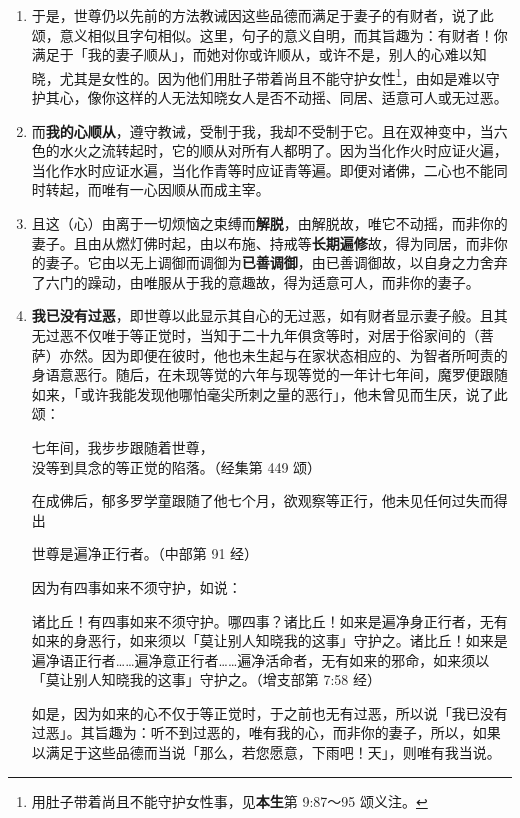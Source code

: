 \begin{enumerate}\item 于是，世尊仍以先前的方法教诫因这些品德而满足于妻子的有财者，说了此颂，意义相似且字句相似。这里，句子的意义自明，而其旨趣为：有财者！你满足于「我的妻子顺从」，而她对你或许顺从，或许不是，别人的心难以知晓，尤其是女性的。因为他们用肚子带着尚且不能守护女性\footnote{用肚子带着尚且不能守护女性事，见\textbf{本生}第 9:87～95 颂义注。}，由如是难以守护其心，像你这样的人无法知晓女人是否不动摇、同居、适意可人或无过恶。
\item 而\textbf{我的心顺从}，遵守教诫，受制于我，我却不受制于它。且在双神变中，当六色的水火之流转起时，它的顺从对所有人都明了。因为当化作火时应证火遍，当化作水时应证水遍，当化作青等时应证青等遍。即便对诸佛，二心也不能同时转起，而唯有一心因顺从而成主宰。
\item 且这（心）由离于一切烦恼之束缚而\textbf{解脱}，由解脱故，唯它不动摇，而非你的妻子。且由从燃灯佛时起，由以布施、持戒等\textbf{长期遍修}故，得为同居，而非你的妻子。它由以无上调御而调御为\textbf{已善调御}，由已善调御故，以自身之力舍弃了六门的躁动，由唯服从于我的意趣故，得为适意可人，而非你的妻子。
\item \textbf{我已没有过恶}，即世尊以此显示其自心的无过恶，如有财者显示妻子般。且其无过恶不仅唯于等正觉时，当知于二十九年俱贪等时，对居于俗家间的（菩萨）亦然。因为即便在彼时，他也未生起与在家状态相应的、为智者所呵责的身语意恶行。随后，在未现等觉的六年与现等觉的一年计七年间，魔罗便跟随如来，「或许我能发现他哪怕毫尖所刺之量的恶行」，他未曾见而生厌，说了此颂：\begin{quoting}七年间，我步步跟随着世尊，\\没等到具念的等正觉的陷落。（经集第 449 颂）\end{quoting}在成佛后，郁多罗学童跟随了他七个月，欲观察等正行，他未见任何过失而得出\begin{quoting}世尊是遍净正行者。（中部第 91 经）\end{quoting}因为有四事如来不须守护，如说：\begin{quoting}诸比丘！有四事如来不须守护。哪四事？诸比丘！如来是遍净身正行者，无有如来的身恶行，如来须以「莫让别人知晓我的这事」守护之。诸比丘！如来是遍净语正行者……遍净意正行者……遍净活命者，无有如来的邪命，如来须以「莫让别人知晓我的这事」守护之。（增支部第 7:58 经）\end{quoting}如是，因为如来的心不仅于等正觉时，于之前也无有过恶，所以说「我已没有过恶」。其旨趣为：听不到过恶的，唯有我的心，而非你的妻子，所以，如果以满足于这些品德而当说「那么，若您愿意，下雨吧！天」，则唯有我当说。\end{enumerate}

